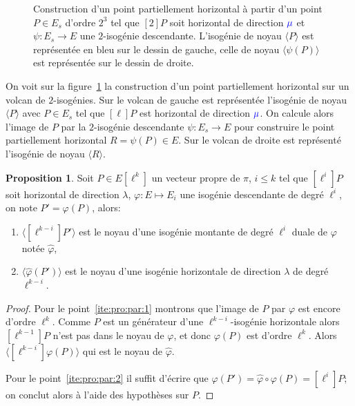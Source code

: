 \documentclass[10pt,a4paper]{book}
\theoremstyle{plain}
\theoremstyle{definition}
\theoremstyle{definition}
\theoremstyle{definition}
\newtheorem{prop}[thm]{Proposition}
\theoremstyle{definition}
\theoremstyle{remark}
\theoremstyle{remark}
\theoremstyle{definition}
\begin{document}
\begin{figure}
\begin{center}
\begin{tikzpicture}[scale=0.50]
\end{tikzpicture}
\end{center}
\caption{ \label{fig:par:hor:con} Construction d'un point partiellement 
horizontal à partir d'un point $P \in E_s$ d'ordre $2^3$ tel que $[2]P$ soit 
horizontal de direction $\color{blue}{\mu}$ et $\psi:E_s \rightarrow E$ une 
$2$-isogénie descendante. L'isogénie de noyau $\langle P \rangle$ est 
représentée en bleu sur le dessin de gauche, celle de noyau $\langle \psi(P) 
\rangle$ est représentée sur le dessin de droite.}
\end{figure}

On voit sur la figure~\ref{fig:par:hor:con} la construction d'un point 
partiellement horizontal sur un volcan de $2$-isogénies. Sur le volcan de 
gauche est représentée l'isogénie de noyau $\langle P \rangle$ avec $P \in E_s$
tel que $[\ell]P$ est horizontal de direction  $\color{blue}{\mu}$. On calcule 
alors l'image de $P$ par la $2$-isogénie descendante $\psi:E_s \rightarrow E$
pour construire le point partiellement horizontal $R=\psi(P) \in E$. Sur le 
volcan de droite est représenté l'isogénie de noyau $\langle R \rangle$.

\begin{prop}
\label{pro:elk:par:hor}
Soit $P \in E[\ell^k]$ un vecteur propre de $\pi$, $i\leqslant k$ tel que 
$[\ell^i]P$ soit horizontal de direction $\lambda$, $\varphi:E \mapsto E_i$ une
isogénie descendante de degré $\ell^i$, on note $P'=\varphi(P)$, alors:
\begin{enumerate}
\item \label{ite:pro:par:1} $\langle [\ell^{k-i}]P' \rangle$ est le noyau d'une isogénie montante de
degré $\ell^{i}$ duale de $\varphi$ notée $\widehat{\varphi}$, 
\item \label{ite:pro:par:2} $\langle \widehat{\varphi}(P') \rangle$ est le noyau d'une isogénie 
horizontale de direction $\lambda$ de degré $\ell^{k-i}$.  
\end{enumerate}
\end{prop}

\begin{proof}
Pour le point~\eqref{ite:pro:par:1} montrons que l'image de $P$ par $\varphi$ est encore d'ordre 
$\ell^k$. Comme $P$ est un générateur d'une $\ell^{k-i}$-isogénie horizontale 
alors $[\ell^{k-1}]P$ n'est pas dans le noyau de $\varphi$, et donc $\varphi(P)$ est 
d'ordre $\ell^k$. Alors $\langle [\ell^{k-i}]\varphi(P) \rangle $ qui est le 
noyau de $\widehat{\varphi}$.  

Pour le point~\eqref{ite:pro:par:2} il suffit d'écrire que $\widehat{\varphi}
(P')=\widehat{\varphi}\circ \varphi (P)= [\ell^i] P$; on conclut alors à l'aide
des hypothèses sur $P$.
\end{proof}
\end{document}
